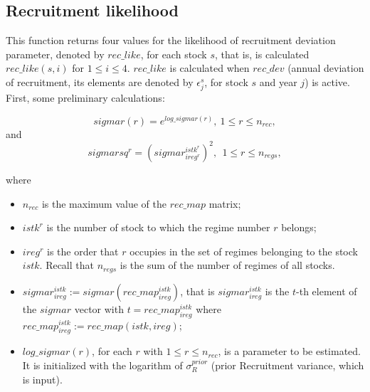 \documentclass{article}
\begin{document}
\subsection{Recruitment likelihood}

This function returns four values for the likelihood of recruitment deviation parameter, denoted by $rec\_like$, for each stock $s$, that is, is calculated $rec\_like(s,i)$ for $1\leq i \leq 4$. $rec\_like$ is calculated when $rec\_dev$ (annual deviation of recruitment, its elements are denoted by $\epsilon^s_j$, for stock $s$ and year $j$) is active.\\

First, some preliminary calculations:

\begin{equation} \label{eq: sigmar}
    sigmar(r)=e^{log\_sigmar(r)}, \ 1\leq r \leq n_{rec},
\end{equation}
and 
\begin{equation}
    sigmarsq^r=(sigmar^{istk^r}_{ireg^r})^2, \ \ 1\leq r \leq n_{regs},
\end{equation}

where

\begin{itemize}
    \item $n_{rec}$ is the maximum value of the $rec\_map$ matrix;
    
    \item $istk^r$ is the number of stock to which the regime number $r$ belongs;
    
    \item $ireg^r$ is the order that $r$ occupies in the set of regimes belonging to the stock $istk$. Recall that $n_{regs}$ is the sum of the number of regimes of all stocks. 
    

    \item $sigmar^{istk}_{ireg}:=sigmar(rec\_map^{istk}_{ireg})$, that is $sigmar^{istk}_{ireg}$ is the $t$-th element of the $sigmar$ vector  with $t=rec\_map^{istk}_{ireg}$ where $rec\_map^{istk}_{ireg}:=rec\_map(istk,ireg)$;
    \item $log\_sigmar(r)$, for each $r$ with $1\leq r\leq n_{rec}$, is a parameter to be estimated. It is initialized with the logarithm of $\sigma_{R}^{prior}$ (prior Recruitment variance, which is input). \\

\end{itemize}
\end{document}
